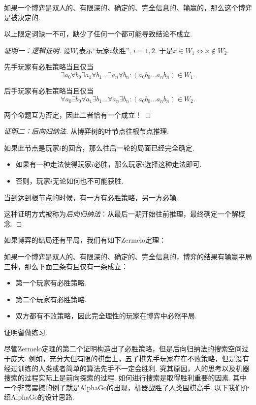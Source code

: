 \begin{theorem}\label{thm:zermelo}
如果一个博弈是双人的、有限深的、确定的、完全信息的、输赢的，那么这个博弈是被决定的.
\end{theorem}
以上限定词缺一不可，缺少了任何一个都可能导致结论不成立.

\begin{proof}[证明一：逻辑证明]
设$W_i$表示“玩家$i$获胜”, $i=1,2$. 于是$x\in W_1\iff x\not\in W_2$.

先手玩家有必胜策略当且仅当
\[\exists a_0\forall b_0\exists a_1\forall b_1\dots\exists a_n\forall b_n: (a_0b_0\dots a_nb_n)\in W_1.\]

后手玩家有必胜策略当且仅当
\[\forall a_0\exists b_0\forall a_1\exists b_1\dots\forall a_n\exists b_n: (a_0b_0\dots a_nb_n)\in W_2.\]

两个命题互为否定，因此二者恰有一个成立！
\end{proof}

\begin{proof}[证明二：后向归纳法]
从博弈树的叶节点往根节点推理.

如果此节点是玩家$i$的回合，那么往后一轮的局面已经完全确定.
\begin{itemize}
    \item 如果有一种走法使得玩家$i$必胜，那么玩家$i$选择这种走法即可.
    \item 否则，玩家$i$无论如何也不可能获胜.
\end{itemize}

当到达到根节点的时候，有一方有必胜策略，另一方必输.

这种证明方式被称为\emph{后向归纳法}：从最后一期开始往前推理，最终确定一个解概念.
\end{proof}

如果博弈的结局还有平局，我们有如下Zermelo定理：
\begin{theorem}[有平局的Zermelo定理]\label{thm:zermelo-draw}
如果一个博弈是双人的、有限深的、确定的、完全信息的，博弈的结果有输赢平局三种，那么下面三条有且仅有一条成立：
\begin{itemize}
    \item 第一个玩家有必胜策略.
    \item 第二个玩家有必胜策略.
    \item 双方都有不败策略，因此完全理性的玩家在博弈中必然平局.
\end{itemize}
\end{theorem}
证明留做练习. 

尽管Zermelo定理的第二个证明构造出了必胜策略，但是后向归纳法的搜索空间过于庞大. 例如，充分大但有限的棋盘上，五子棋先手玩家存在不败策略，但是没有经过训练的人类或者简单的算法先手不一定会胜利. 究其原因，人的思考以及机器搜索的过程实际上是前向探索的过程. 如何进行搜索是取得胜利重要的因素. 其中一个非常震撼的例子就是AlphaGo的出现，机器战胜了人类围棋高手. 以下我们介绍AlphaGo的设计思路.

